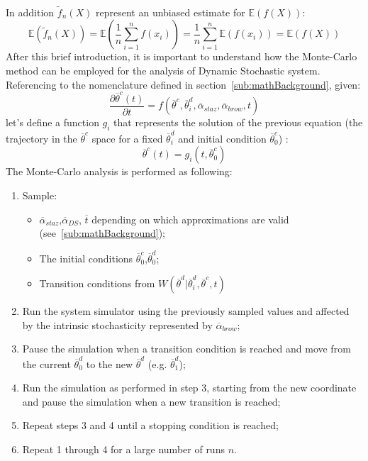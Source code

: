 \\In addition $\widetilde{f}_{n}(X)$ represent an unbiased estimate for $\mathbb{E}(f(X))$:
\begin{equation}
\mathbb{E}(\widetilde{f}_{n}(X)) = \mathbb{E} \left ( \frac{1}{n} \sum_{i=1}^{n} f(x_{i})   \right ) = 
\frac{1}{n} \sum_{i=1}^{n} \mathbb{E}(f(x_{i})) =   \mathbb{E}(f(X)) 
\end{equation}
After this brief introduction, it is important to understand how the Monte-Carlo method can be employed 
for the analysis of Dynamic Stochastic system.
\\Referencing to the nomenclature defined in section~\ref{sub:mathBackground}, given:
\begin{equation}
\frac{\partial  \overline{\theta}^{c}\left ( t \right )}{\partial t}=f\left ( \overline{\theta}^{c},\overline{\theta}^{d}_{i}, \overline{\alpha}_{staz} ,\overline{\alpha}_{brow}, t \right )
\end{equation}
let's define a function $g_{i}$ that represents the solution of the previous equation (the trajectory in the $ \overline{\theta}^{c}$ space for a fixed $ \overline{\theta}^{d}_{i}$ and initial condition $\overline{\theta}^{c}_{0}$) :
\begin{equation}
  \overline{\theta}^{c}(t) = g_{i}(t,\overline{\theta}^{c}_{0})
\end{equation}
The Monte-Carlo analysis is performed as following:
\begin{enumerate}
  \item Sample:
  \begin{itemize}
    \item $\overline{\alpha}_{staz} $,$\overline{\alpha}_{DS}$, $\overline{t}$ depending on which 
    approximations are valid (see~\ref{sub:mathBackground});
    \item The initial conditions $\overline{\theta}^{c}_{0}$,$\overline{\theta}^{d}_{0}$;
    \item Transition conditions from $W(\overline{\theta}^{d}|\overline{\theta}^{d}_{i},\overline{\theta}^{c},t)$
  \end{itemize}
  \item Run the system simulator using the previously sampled values and affected by the intrinsic stochasticity 
  represented by $\overline{\alpha}_{brow}$;
  \item Pause the simulation when a transition condition is reached and move from the current $\overline{\theta}^{d}_{0}$ to the new $\overline{\theta}^{d}$ (e.g. $\overline{\theta}^{d}_{1}$);
  \item Run the simulation as performed in step 3, starting from the new coordinate and pause the simulation when a new transition is reached;
  \item Repeat steps 3 and 4 until a stopping condition is reached;
  \item Repeat 1 through 4 for a large number of runs $n$.
\end{enumerate}



